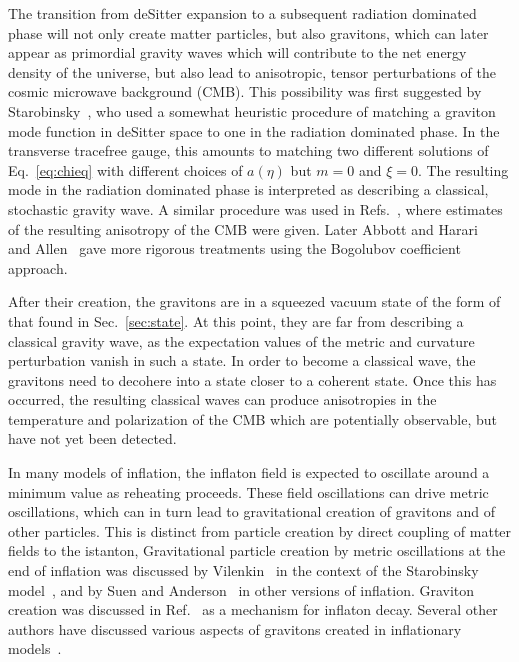 \documentclass[eqsecnum,floats,aps,prd,floatfix,titlepage,tightenlines]{revtex4}
\begin{document}
The transition from deSitter expansion to a subsequent radiation dominated phase will not only create matter particles,
but also gravitons, which can later appear as primordial gravity waves which will contribute to the net energy density
of the universe, but also lead to anisotropic, tensor perturbations of the cosmic microwave background (CMB). This possibility
was first suggested by Starobinsky~\cite{S79}, who used a  somewhat heuristic procedure of matching  a graviton mode
function in deSitter space to one in the radiation dominated phase. In the transverse tracefree gauge, this amounts to
matching two different solutions of Eq.~\eqref{eq:chieq} with different choices of $a(\eta)$ but $m=0$ and $\xi =0$.
The resulting mode in the radiation dominated phase  is interpreted as describing a classical, stochastic gravity wave.
A similar procedure was used in Refs.~\cite{RSV82,FP83,AW84a,AW84b}, where estimates of the resulting anisotropy
of the CMB were given. Later Abbott and Harari~\cite{AH86} and Allen~\cite{A88} gave more rigorous treatments using
the Bogolubov coefficient approach.

After their creation, the gravitons are in a squeezed vacuum state of the form of that found in Sec.~\ref{sec:state}. At
this point, they are far from describing a classical gravity wave, as the expectation values of the metric and curvature
perturbation vanish in such a state. In order to become a classical wave, the gravitons need to decohere into a state
closer to a coherent state.
Once this has occurred, the resulting classical waves can produce anisotropies in the temperature and polarization of the
CMB which are potentially  observable, but have not yet been detected.

In many models of inflation, the inflaton field is expected to oscillate around a minimum value as reheating proceeds.
These field oscillations can drive metric oscillations, which can in turn lead to gravitational creation of gravitons and
of other particles. This is distinct from particle creation by direct coupling of matter fields to the istanton, Gravitational
particle creation by metric oscillations at the end of inflation was discussed by Vilenkin~\cite{Vilenkin:1985} in the context of the
Starobinsky model~\cite{Starobinsky80}, and by Suen and Anderson~\cite{SA87} in other  versions of inflation.
Graviton creation was discussed in Ref.~\cite{Ema:2015}  as a mechanism for inflaton decay. 
Several other authors have discussed various aspects of gravitons created in inflationary 
models~\cite{Yainik90,Grishchuk-Sidorov90,Maia93,Henriques94,Mendes99,Allen2000,Henriques04,Giovannini20}. 
\end{document}
